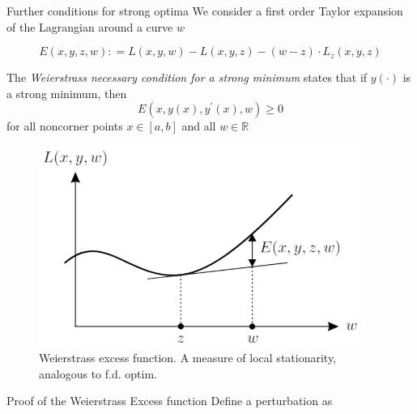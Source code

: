 \documentclass{beamer}
\begin{document}
    \begin{frame}{Further conditions for strong optima}
        We consider a first order Taylor expansion of the Lagrangian around a curve $w$
        \begin{definition}
            \begin{equation*}
                E ( x , y , z , w ) : = L ( x , y , w ) - L ( x , y , z ) - ( w - z ) \cdot L _ { z } ( x , y , z )
            \end{equation*}
        \end{definition}
        The \emph{Weierstrass necessary condition for a strong minimum}  states
        that if $y ( \cdot )$ is a strong minimum, then
        \begin{equation*}
        E \left( x , y ( x ) , y ^ { \prime } ( x ) , w \right) \geq 0
        \end{equation*}
        for all noncorner points $x \in [ a , b ]$ and all $w \in \mathbb { R }$
    \end{frame}
    \begin{frame}
        \begin{figure}[!htb]
            \centering
            \includegraphics[width=0.95\textwidth]{ch3/Wexcess1.png}
            \caption{Weierstrass excess function. A measure of local stationarity, analogous to f.d. optim.}
        \end{figure}
    \end{frame}
    \begin{frame}{Proof of the Weierstrass Excess function}
        Define a perturbation as
    \end{frame}
\end{document}
